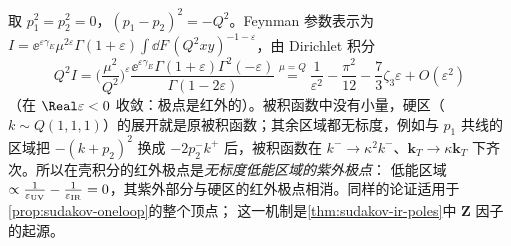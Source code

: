 \begin{example}[在壳无质量形状因子 = 硬区]\label{ex:sudakov-onshell-hard}
取 $p_1^2=p_2^2=0$，$(p_1-p_2)^2=-Q^2$。Feynman 参数表示为 $I=\ee^{\varepsilon\gamma_E}\mu^{2\varepsilon}\Gamma(1+\varepsilon)\int\!\dd F\,(Q^2xy)^{-1-\varepsilon}$，由 Dirichlet 积分
\begin{equation}\label{eq:sudakov-onshell-H}
Q^2I=\Big(\frac{\mu^2}{Q^2}\Big)^{\varepsilon}\frac{\ee^{\varepsilon\gamma_E}\Gamma(1+\varepsilon)\Gamma^2(-\varepsilon)}{\Gamma(1-2\varepsilon)}
\overset{\mu=Q}{=}\frac1{\varepsilon^2}-\frac{\pi^2}{12}-\frac73\zeta_3\varepsilon+O(\varepsilon^2)
\end{equation}
（在 $\Real\varepsilon<0$ 收敛：极点是红外的）。被积函数中没有小量，硬区（$k\sim Q(1,1,1)$）的展开就是原被积函数；其余区域都无标度，例如与 $p_1$ 共线的区域把
$-(k+p_2)^2$ 换成 $-2p_2^-k^+$ 后，被积函数在 $k^-\to\kappa^2k^-$、$\mathbf k_T\to\kappa\mathbf k_T$ 下齐次。所以在壳积分的红外极点是\emph{无标度低能区域的紫外极点}：
低能区域 $\propto\frac1{\varepsilon_{\rm UV}}-\frac1{\varepsilon_{\rm IR}}=0$，其紫外部分与硬区的红外极点相消。同样的论证适用于\cref{prop:sudakov-oneloop}的整个顶点；
这一机制是\cref{thm:sudakov-ir-poles}中 $\mathbf Z$ 因子的起源。
\end{example}

